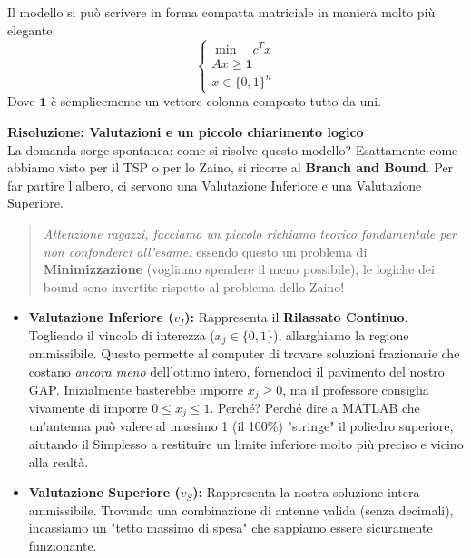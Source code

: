 \documentclass[12pt, a4paper]{article}
\begin{document}
	Il modello si può scrivere in forma compatta matriciale in maniera molto più elegante:
	\[
	\begin{cases} 
		\min \quad c^T x \\ 
		A x \geq \mathbf{1} \\ 
		x \in \{0, 1\}^n 
	\end{cases}
	\]
	Dove $\mathbf{1}$ è semplicemente un vettore colonna composto tutto da uni.
	
	\vspace{0.4cm}
	\textbf{Risoluzione: Valutazioni e un piccolo chiarimento logico}\\
	La domanda sorge spontanea: come si risolve questo modello? Esattamente come abbiamo visto per il TSP o per lo Zaino, si ricorre al \textbf{Branch and Bound}. Per far partire l'albero, ci servono una Valutazione Inferiore e una Valutazione Superiore.
	
	\begin{quote}
		\textit{Attenzione ragazzi, facciamo un piccolo richiamo teorico fondamentale per non confonderci all'esame:} essendo questo un problema di \textbf{Minimizzazione} (vogliamo spendere il meno possibile), le logiche dei bound sono invertite rispetto al problema dello Zaino!
	\end{quote}
	
	\begin{itemize}[label=\textcolor{titlecolor}{\Large\textbullet}, itemsep=4pt, leftmargin=1.5cm]
		\item \textbf{Valutazione Inferiore ($v_I$):} Rappresenta il \textbf{Rilassato Continuo}. Togliendo il vincolo di interezza ($x_j \in \{0,1\}$), allarghiamo la regione ammissibile. Questo permette al computer di trovare soluzioni frazionarie che costano \textit{ancora meno} dell'ottimo intero, fornendoci il pavimento del nostro GAP.
		Inizialmente basterebbe imporre $x_j \geq 0$, ma il professore consiglia vivamente di imporre \textbf{$0 \leq x_j \leq 1$}. Perché? Perché dire a MATLAB che un'antenna può valere al massimo 1 (il 100\%) "stringe" il poliedro superiore, aiutando il Simplesso a restituire un limite inferiore molto più preciso e vicino alla realtà.
		
		\item \textbf{Valutazione Superiore ($v_S$):} Rappresenta la nostra soluzione intera ammissibile. Trovando una combinazione di antenne valida (senza decimali), incassiamo un "tetto massimo di spesa" che sappiamo essere sicuramente funzionante.
	\end{itemize}
	
\end{document}
